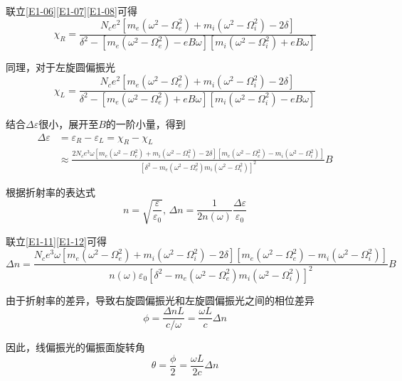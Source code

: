 \documentclass[10pt,a4paper,onecolumn,UTF8]{ctexart}
\begin{document}
	联立\eqref{E1-06}\eqref{E1-07}\eqref{E1-08}可得
	\begin{equation}\label{E1-09}
		\chi_R=\frac{N_ce^2\left[m_e(\omega^2-\Omega_e^2)+m_i(\omega^2-\Omega_i^2)-2\delta\right]}{\delta^2-\left[m_e(\omega^2-\Omega_e^2)-eB\omega\right]\left[m_i(\omega^2-\Omega_i^2)+eB\omega\right]}
	\end{equation}
	
	同理，对于左旋圆偏振光
	\begin{equation}\label{E1-10}
		\chi_L=\frac{N_ce^2\left[m_e(\omega^2-\Omega_e^2)+m_i(\omega^2-\Omega_i^2)-2\delta\right]}{\delta^2-\left[m_e(\omega^2-\Omega_e^2)+eB\omega\right]\left[m_i(\omega^2-\Omega_i^2)-eB\omega\right]}
	\end{equation}
	
	结合$\Delta\varepsilon$很小，展开至$B$的一阶小量，得到
	\begin{equation}\label{E1-11}
		\begin{aligned}
			\Delta\varepsilon&=\varepsilon_R-\varepsilon_L=\chi_R-\chi_L\\
			&\approx\frac{2N_ce^3\omega\left[m_e(\omega^2-\Omega_e^2)+m_i(\omega^2-\Omega_i^2)-2\delta\right]\left[m_e(\omega^2-\Omega_e^2)-m_i(\omega^2-\Omega_i^2)\right]}{\left[\delta^2-m_e(\omega^2-\Omega_e^2)m_i(\omega^2-\Omega_i^2)\right]^2}B
		\end{aligned}
	\end{equation}
	
	根据折射率的表达式
	\begin{equation}\label{E1-12}
		n=\sqrt{\frac{\varepsilon}{\varepsilon_0}},\,\Delta n=\frac{1}{2n(\omega)}\frac{\Delta\varepsilon}{\varepsilon_0}
	\end{equation}
	
	联立\eqref{E1-11}\eqref{E1-12}可得
	\begin{equation}\label{E1-13}
		\Delta n=\frac{N_ce^3\omega\left[m_e(\omega^2-\Omega_e^2)+m_i(\omega^2-\Omega_i^2)-2\delta\right]\left[m_e(\omega^2-\Omega_e^2)-m_i(\omega^2-\Omega_i^2)\right]}{n(\omega)\varepsilon_0\left[\delta^2-m_e(\omega^2-\Omega_e^2)m_i(\omega^2-\Omega_i^2)\right]^2}B
	\end{equation}
	
	由于折射率的差异，导致右旋圆偏振光和左旋圆偏振光之间的相位差异
	\begin{equation}
		\phi=\frac{\Delta n L}{c/\omega}=\frac{\omega L}{c}\Delta n
	\end{equation}
	
	因此，线偏振光的偏振面旋转角
	\begin{equation}\label{E1-15}
		\theta=\frac{\phi}{2}=\frac{\omega L}{2 c}\Delta n
	\end{equation}
	
\end{document}
